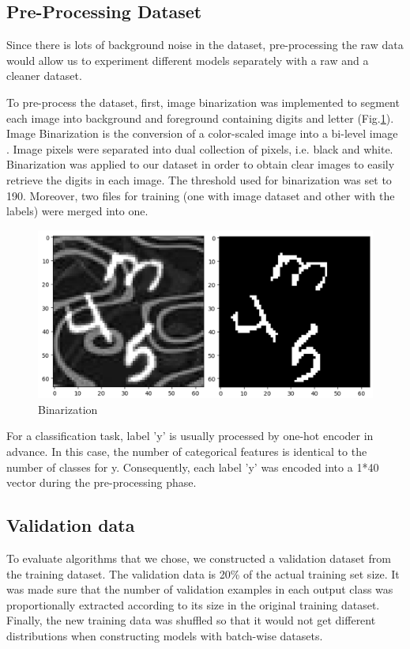 \documentclass[10pt,conference]{IEEEtran}
\begin{document}
\subsection{Pre-Processing Dataset}

Since there is lots of background noise in the dataset, pre-processing the raw data would allow us to experiment different models separately with a raw and a cleaner dataset.

To pre-process the dataset, first, image binarization was implemented to segment each image into background and foreground containing digits and letter (Fig.\ref{bin}). Image Binarization is the conversion of a color-scaled image into a bi-level image \cite{trier1995evaluation}. Image pixels were separated into dual collection of pixels, i.e. black and white. Binarization was applied to our dataset in order to obtain clear images to easily retrieve the digits in each image. The threshold used for binarization was set to 190. Moreover, two files for training (one with image dataset and other with the labels) were merged into one.

\begin{figure}
  \centering
  \includegraphics[width = 0.6\linewidth]{binary}
  \caption{Binarization}
  \label{bin}
\end{figure}
For a classification task, label 'y' is usually processed by one-hot encoder in advance. In this case, the number of categorical features is identical to the number of classes for y. Consequently, each label 'y' was encoded into a 1*40 vector during the pre-processing phase.


\subsection{Validation data}
To evaluate algorithms that we chose, we constructed a validation dataset from the training dataset. The validation data is 20\% of the actual training set size. It was made sure that the number of validation examples in each output class was proportionally extracted according to its size in the original training dataset. Finally, the new training data was shuffled so that it would not get different distributions when constructing models with batch-wise datasets.
\end{document}
